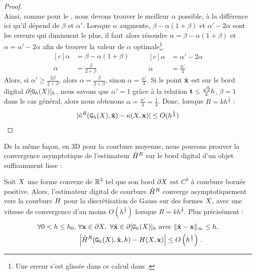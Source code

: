 \begin{proof}
\begin{equation}
\end{equation}
%
Ainsi, comme pour le , nous devons trouver
le meilleur $\alpha$ possible, à la différence ici qu'il dépend de $\beta$ et
$\alpha'$.
%
Lorsque $\alpha$ augmente, $\beta-\alpha(1+\beta)$ et $\alpha'-2\alpha$ sont les
erreurs qui diminuent le plus, il faut alors résoudre $\alpha =
\beta-\alpha(1+\beta)$ et $\alpha = \alpha'-2\alpha$ afin de trouver la valeur
de $\alpha$ optimale\footnote{Une erreur s'est glissée dans ce calcul dans
\cite{DGCI2013}.}.
%
\begin{equation}
\begin{aligned}[c]
  \alpha &= \beta-\alpha(1+\beta)\\
  \alpha &= \frac{\beta}{2+\beta}
\end{aligned}
\qquad
\begin{aligned}[c]
  \alpha &= \alpha' - 2\alpha\\
  \alpha &= \frac{\alpha'}{3}
\end{aligned}
\end{equation}
%
Alors, si $\alpha' \ge \frac{3 \beta}{2 + \beta}$, alors $\alpha = \frac{\beta}{2 +
\beta}$, sinon $\alpha = \frac{\alpha'}{3}$.
%
Si le point $\hat{\mathbf{x}}$ est sur le bord digital $\partial \lbrack \mathtt{G}_{h}(X) \rbrack_{h}$, nous savons
que $\alpha'=1$ grâce à la relation $\mathbf{t} \le \frac{\sqrt{2}}{2}h$, $\beta = 1$
dans le cas général, alors nous obtenons $\alpha = \frac{\alpha'}{3} =
\frac{1}{3}$. Donc, lorsque $R = kh^{\frac{1}{3}}$ :
%
\begin{equation}
  | \hat{\kappa}^{R}(\mathtt{G}_{h}(X),\hat{\mathbf{x}}) - \kappa(X,\mathbf{x}) | \le O(h^{\frac{1}{3}})
\end{equation}
%
\end{proof}
%
De la même façon, en 3D pour la courbure moyenne, nous pouvons prouver la
convergence asymptotique de l'estimateur $\hat{H}^{R}$ sur le bord digital
d'un objet suffisamment lisse :
%
\begin{theorem} \label{thm:multigrid-convergence-curv-mean}
%
Soit $X$ une forme convexe de $\mathbb{R}^3$ tel que son bord $\partial X$ est $C^3$ à
courbure bornée positive. Alors, l'estimateur digital de courbure $\hat{H}^{R}$ converge
asymptotiquement vers la courbure $H$ pour la discrétisation de Gauss sur
des formes $X$, avec une vitesse de convergence d'au moins
$O(h^\frac{1}{3})$ lorsque $R = kh^\frac{1}{3}$. Plus précisément :
%
\begin{align}
  \forall 0 < h \le h_0,\,\, & \forall \mathbf{x} \in \partial X,\,\,
  \forall \hat{\mathbf{x}} \in \partial \lbrack \mathtt{G}_{h}(X) \rbrack_{h} \text{~avec~} \| \hat{\mathbf{x}} -\mathbf{x}\|_\infty \le h, \nonumber \\
  & \left| \hat{H}^{R}(\mathtt{G}_{h}(X), \hat{\mathbf{x}}, h) - H(X, \mathbf{x}) \right| \le O\left(h^{\frac{1}{3}}\right)\,.
\end{align}
%
\end{theorem}
